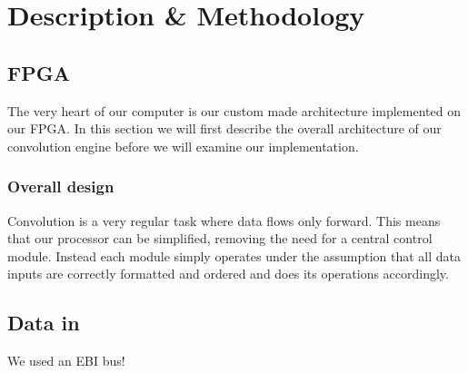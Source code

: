\chapter{Description \& Methodology}

\section{FPGA}

The very heart of our computer is our custom made architecture implemented on our FPGA.
In this section we will first describe the overall architecture of our convolution engine before we will examine our implementation.

\subsection{Overall design}

Convolution is a very regular task where data flows only forward. This means that our processor can be simplified, removing the need for a central control module.
Instead each module simply operates under the assumption that all data inputs are correctly formatted and ordered and does its operations accordingly.

\section{Data in}

We used an EBI bus!

